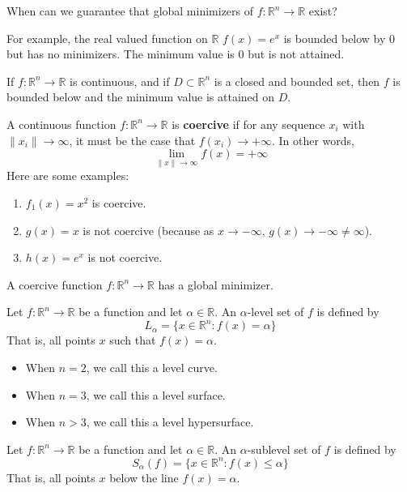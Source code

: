 \begin{problem}[Motivation]
  When can we guarantee that global minimizers of $f: \mathbb R^n \rightarrow \mathbb R$ exist?

  For example, the real valued function on $\mathbb R$ $f(x) = e^x$ is bounded below by 0 but has no minimizers. The minimum value is 0 but is not attained.
\end{problem}
\begin{proposition}
  If $f: \mathbb R^n \rightarrow \mathbb R$ is continuous, and if $D \subset \mathbb R^n$ is a closed and bounded set, then $f$ is bounded below and the minimum value is attained on $D$.
\end{proposition}
\begin{definition}
  A continuous function $f: \mathbb R^n \rightarrow \mathbb R$ is \textbf{coercive} if for any sequence $x_i$ with $\|x_i \| \rightarrow \infty$, it must be the case that $f(x_i) \rightarrow +\infty$. In other words, $$\lim_{\|x\| \rightarrow \infty} f(x) = +\infty$$
  Here are some examples:
  \begin{enumerate}
    \item $f_1(x) = x^2$ is coercive.
    \item $g(x) = x$ is not coercive (because as $x \rightarrow -\infty$, $g(x) \rightarrow -\infty \neq \infty$).
    \item $h(x) = e^x$ is not coercive.
  \end{enumerate}
\end{definition}
\begin{proposition}
  A coercive function $f: \mathbb R^n \rightarrow \mathbb R$ has a global minimizer.
\end{proposition}
\begin{definition}
  Let $f: \mathbb R^n \to \mathbb R$ be a function and let $\alpha \in \mathbb R$. An $\alpha$-level set of $f$ is defined by $$L_\alpha = \{x \in \mathbb R^n: f(x) = \alpha\}$$
  That is, all points $x$ such that $f(x) = \alpha$.
  \begin{itemize}
    \item When $n = 2$, we call this a level curve.
    \item When $n = 3$, we call this a level surface.
    \item When $n > 3$, we call this a level hypersurface.
  \end{itemize}
\end{definition}
\begin{definition}
  Let $f: \mathbb R^n \to \mathbb R$ be a function and let $\alpha \in \mathbb R$. An $\alpha$-sublevel set of $f$ is defined by $$S_\alpha(f) = \{x \in \mathbb R^n: f(x) \leq \alpha\}$$
  That is, all points $x$ below the line $f(x) = \alpha$.
\end{definition}

